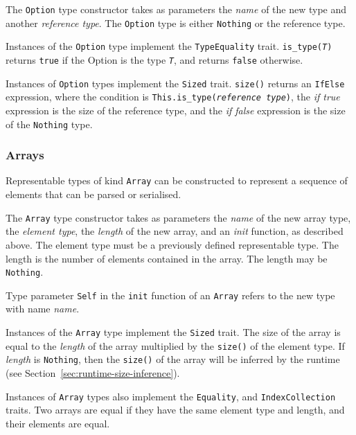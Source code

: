 \documentclass[10pt,twocolumn,a4paper]{article}
\newcommand{\code}[1]{\texttt{#1}}
\begin{document}
The \code{Option} type constructor takes as parameters the \emph{name} of the
new type and another \emph{reference type}. The \code{Option} type is either
\code{Nothing} or the reference type.

Instances of the \code{Option} type implement the \code{TypeEquality} trait.
\code{is\_type(\emph{T})} returns \code{true} if the Option is the type
\code{\emph{T}}, and returns \code{false} otherwise.

Instances of \code{Option} types implement the \code{Sized} trait. \code{size()}
returns an \code{IfElse} expression, where the condition is
\code{This.is\_type(\emph{reference type})}, the \emph{if true} expression is
the size of the reference type, and the \emph{if false} expression is the size
of the \code{Nothing} type.

\subsubsection{Arrays}

Representable types of kind \code{Array} can be constructed to represent
a sequence of elements that can be parsed or serialised.

The \code{Array} type constructor takes as parameters the \emph{name} of
the new array type, the \emph{element type}, the \emph{length} of the
new array, and an \emph{init} function, as described above.
The element type must be a previously defined representable type.
The length is the number of elements contained in the array.
The length may be \code{Nothing}.

Type parameter \code{Self} in the \code{init} function of an \code{Array} refers
to the new type with name \emph{name}.

Instances of the \code{Array} type implement the \code{Sized} trait. The size of
the array is equal to the \emph{length} of the array multiplied by the
\code{size()} of the element type. If \emph{length} is \code{Nothing}, then the
\code{size()} of the array will be inferred by the runtime (see
Section~\ref{sec:runtime-size-inference}).

Instances of \code{Array} types also implement the \code{Equality},
and \code{IndexCollection} traits.
Two arrays are equal if they have the same element type and length, and
their elements are equal.

\end{document}
